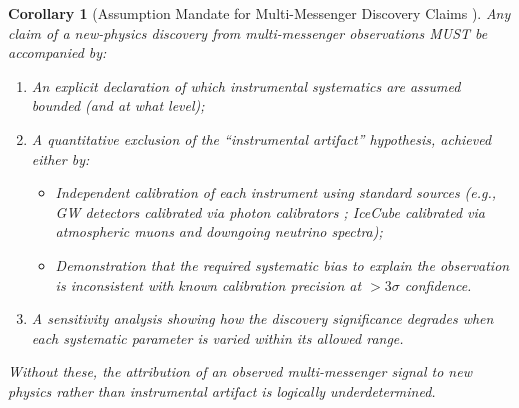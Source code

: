 \documentclass[11pt,a4paper]{article}
\newtheorem{corollary}[theorem]{Corollary}
\theoremstyle{definition}
\begin{document}
\begin{corollary}[Assumption Mandate for Multi-Messenger Discovery Claims ]\label{cor:assumption_mandate_astro}
Any claim of a new-physics discovery from multi-messenger observations MUST be accompanied by:
\begin{enumerate}[label=(\roman*)]
    \item An explicit declaration of which instrumental systematics are assumed bounded (and at what level);
    \item A quantitative exclusion of the ``instrumental artifact'' hypothesis, achieved either by:
        \begin{itemize}
            \item Independent calibration of each instrument using standard sources (e.g., GW detectors calibrated via photon calibrators \cite{LIGOcalibration2021}; IceCube calibrated via atmospheric muons and downgoing neutrino spectra);
            \item Demonstration that the required systematic bias to explain the observation is inconsistent with known calibration precision at $>3\sigma$ confidence.
        \end{itemize}
    \item A sensitivity analysis showing how the discovery significance degrades when each systematic parameter is varied within its allowed range.
\end{enumerate}
Without these, the attribution of an observed multi-messenger signal to new physics rather than instrumental artifact is logically underdetermined.
\end{corollary}
\end{document}
